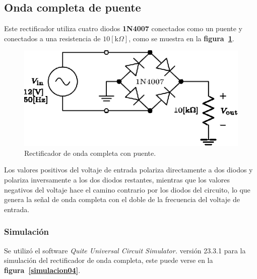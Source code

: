 \subsection{Onda completa de puente}
Este rectificador utiliza cuatro diodos \textbf{1N4007} conectados como un
puente y conectados a una resistencia de $10[\text{k}\Omega]$, como se muestra
en la \textbf{figura~\ref{circuito04}}.

\begin{figure}[!h]
\centering
\includegraphics[scale=1]{diagramas/04.onda_completa1.eps}
\caption{Rectificador de onda completa con puente.}
\label{circuito04}
\end{figure}

Los valores positivos del voltaje de entrada polariza directamente a dos diodos
y polariza inversamente a los dos diodos restantes, mientras que los valores
negativos del voltaje hace el camino contrario por los diodos del circuito, lo
que genera la señal de onda completa con el doble de la frecuencia del voltaje
de entrada.

\subsubsection{Simulación}
Se utilizó el software \emph{Quite Universal Circuit Simulator.} versión 23.3.1
para la simulación del rectificador de onda completa, este puede verse en la
\textbf{figura~\ref{simulacion04}}.

